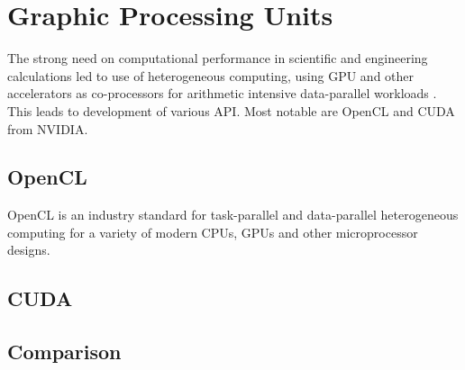 \chapter{Graphic Processing Units}
The strong need on computational performance in scientific and engineering calculations led to use of heterogeneous computing, using GPU and other accelerators as co-processors for arithmetic intensive data-parallel workloads \cite{stone10}. This leads to development of various API. Most notable are OpenCL and CUDA from NVIDIA.

\section{OpenCL}
OpenCL is an industry standard for task-parallel and data-parallel heterogeneous computing for a variety of modern CPUs, GPUs and other microprocessor designs\cite{stone10}.

\section{CUDA}

\section{Comparison} 
